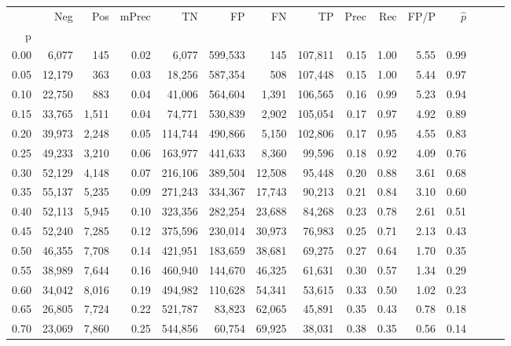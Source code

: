 \begin{tabular}{rrrrrrrrrrrrrrr}
\toprule
{} &     Neg &    Pos & mPrec &       TN &       FP &       FN &       TP &  Prec &   Rec &  FP/P & $\hat{p}$ \\
p    &         &        &       &          &          &          &          &       &       &       &           \\
\midrule
0.00 &   6,077 &    145 &  0.02 &    6,077 &  599,533 &      145 &  107,811 &  0.15 &  1.00 &  5.55 &      0.99 \\
0.05 &  12,179 &    363 &  0.03 &   18,256 &  587,354 &      508 &  107,448 &  0.15 &  1.00 &  5.44 &      0.97 \\
0.10 &  22,750 &    883 &  0.04 &   41,006 &  564,604 &    1,391 &  106,565 &  0.16 &  0.99 &  5.23 &      0.94 \\
0.15 &  33,765 &  1,511 &  0.04 &   74,771 &  530,839 &    2,902 &  105,054 &  0.17 &  0.97 &  4.92 &      0.89 \\
0.20 &  39,973 &  2,248 &  0.05 &  114,744 &  490,866 &    5,150 &  102,806 &  0.17 &  0.95 &  4.55 &      0.83 \\
0.25 &  49,233 &  3,210 &  0.06 &  163,977 &  441,633 &    8,360 &   99,596 &  0.18 &  0.92 &  4.09 &      0.76 \\
0.30 &  52,129 &  4,148 &  0.07 &  216,106 &  389,504 &   12,508 &   95,448 &  0.20 &  0.88 &  3.61 &      0.68 \\
0.35 &  55,137 &  5,235 &  0.09 &  271,243 &  334,367 &   17,743 &   90,213 &  0.21 &  0.84 &  3.10 &      0.60 \\
0.40 &  52,113 &  5,945 &  0.10 &  323,356 &  282,254 &   23,688 &   84,268 &  0.23 &  0.78 &  2.61 &      0.51 \\
0.45 &  52,240 &  7,285 &  0.12 &  375,596 &  230,014 &   30,973 &   76,983 &  0.25 &  0.71 &  2.13 &      0.43 \\
0.50 &  46,355 &  7,708 &  0.14 &  421,951 &  183,659 &   38,681 &   69,275 &  0.27 &  0.64 &  1.70 &      0.35 \\
0.55 &  38,989 &  7,644 &  0.16 &  460,940 &  144,670 &   46,325 &   61,631 &  0.30 &  0.57 &  1.34 &      0.29 \\
0.60 &  34,042 &  8,016 &  0.19 &  494,982 &  110,628 &   54,341 &   53,615 &  0.33 &  0.50 &  1.02 &      0.23 \\
0.65 &  26,805 &  7,724 &  0.22 &  521,787 &   83,823 &   62,065 &   45,891 &  0.35 &  0.43 &  0.78 &      0.18 \\
0.70 &  23,069 &  7,860 &  0.25 &  544,856 &   60,754 &   69,925 &   38,031 &  0.38 &  0.35 &  0.56 &      0.14 \\

\end{tabular}

